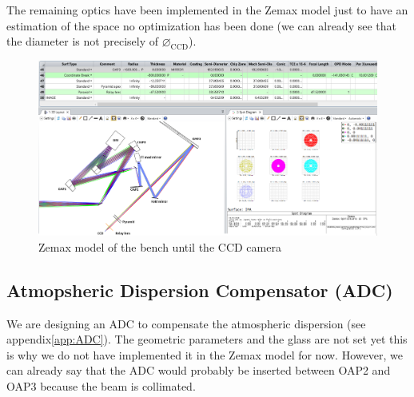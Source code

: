\documentclass[12pt,a4paper]{article}
\begin{document}
The remaining optics have been implemented in the Zemax model just to have an estimation of the space no optimization has been done (we can already see that the diameter is not precisely of $\diameter_\text{CCD}$).\\
\begin{figure}[H]
	\begin{center}
		\includegraphics[width=\textwidth]{images/Zemax_model_FP_CCD.PNG}
		\caption{Zemax model of the bench until the CCD camera}\label{fig:Zemax_model_FP_CCD}
	\end{center}
\end{figure}

\subsection{Atmopsheric Dispersion Compensator (ADC)}
We are designing an ADC to compensate the atmospheric dispersion (see appendix\ref{app:ADC}). The geometric parameters and the glass are not set yet this is why we do not have implemented it in the Zemax model for now. However, we can already say that the ADC would probably be inserted between OAP2 and OAP3 because the beam is collimated.
\newpage

\renewcommand{\bibname}{References}


\end{document}
